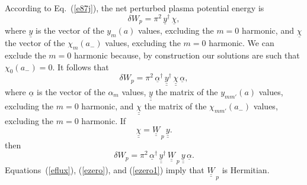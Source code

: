 \documentclass[12pt,prb,aps]{revtex4-1}
\begin{document}
According to Eq.~(\ref{e87j}), the net perturbed plasma potential energy is
\begin{equation}
\delta W_p = \pi^2\,\underline{y}^{\dag}\,\underline{\chi},
\end{equation}
where $\underline{y}$ is the vector of the $y_m(a)$ values, excluding the $m=0$ harmonic,  and $\underline{\chi}$  the vector of the $\chi_m(a_-)$ values,
excluding the $m=0$ harmonic.  We can exclude the $m=0$ harmonic because, by construction our solutions are such that $\chi_0(a_-)=0$. It follows that
\begin{equation}
\delta W_p = \pi^2\,\underline{\alpha}^\dag \,\underline{\underline{y}}^\dag \,\underline{\underline{\chi}}\,\underline{\alpha},
\end{equation}
where $\underline{\alpha}$ is the vector of the $\alpha_m$ values, $\underline{\underline{y}}$ the matrix of the $y_{mm'}(a)$ values, excluding the $m=0$ harmonic, 
and $\underline{\underline{\chi}}$ the matrix of the $\chi_{mm'}(a_-)$ values, excluding the $m=0$ harmonic. 
If
\begin{equation}
\underline{\underline{\chi}} = \underline{\underline{W}}_{\,p}\,\underline{\underline{y}}.
\end{equation}
then 
\begin{equation}
\delta W_p = \pi^2\,\underline{\alpha}^\dag \,\underline{\underline{y}}^\dag \,\underline{\underline{W}}_{\,p}\,\underline{\underline{y}}\,\underline{\alpha}.
\end{equation}
Equations~(\ref{eflux}), (\ref{ezero}), and (\ref{ezero1}) imply that $\underline{\underline{W}}_{\,p}$ is Hermitian. 
\end{document}

